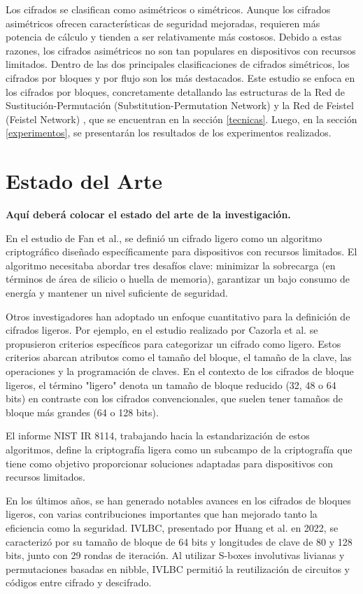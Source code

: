 \documentclass[conference]{IEEEtran}
\begin{document}
Los cifrados se clasifican como asimétricos o simétricos. Aunque los cifrados asimétricos ofrecen características de seguridad mejoradas, requieren más potencia de cálculo y tienden a ser relativamente más costosos. Debido a estas razones, los cifrados asimétricos no son tan populares en dispositivos con recursos limitados. Dentro de las dos principales clasificaciones de cifrados simétricos, los cifrados por bloques y por flujo son los más destacados. Este estudio se enfoca en los cifrados por bloques, concretamente detallando las estructuras de la Red de Sustitución-Permutación (Substitution-Permutation Network) \cite{heys1996substitution} y la Red de Feistel (Feistel Network) \cite{FEISTEL}, que se encuentran en la sección \ref{tecnicas}. Luego, en la sección \ref{experimentos}, se presentarán los resultados de los experimentos realizados.

\section{Estado del Arte}
\textbf{Aquí deberá colocar el estado del arte de la investigación.}

En el estudio de Fan et al.\cite{fan2013wg}, se definió un cifrado ligero como un algoritmo criptográfico diseñado específicamente para dispositivos con recursos limitados. El algoritmo necesitaba abordar tres desafíos clave: minimizar la sobrecarga (en términos de área de silicio o huella de memoria), garantizar un bajo consumo de energía y mantener un nivel suficiente de seguridad.

Otros investigadores han adoptado un enfoque cuantitativo para la definición de cifrados ligeros. Por ejemplo, en el estudio realizado por Cazorla et al.\cite{cazorla2013survey} se propusieron criterios específicos para categorizar un cifrado como ligero. Estos criterios abarcan atributos como el tamaño del bloque, el tamaño de la clave, las operaciones y la programación de claves. En el contexto de los cifrados de bloque ligeros, el término "ligero" denota un tamaño de bloque reducido (32, 48 o 64 bits) en contraste con los cifrados convencionales, que suelen tener tamaños de bloque más grandes (64 o 128 bits).

El informe NIST IR 8114\cite{NIST}, trabajando hacia la estandarización de estos algoritmos, define la criptografía ligera como un subcampo de la criptografía que tiene como objetivo proporcionar soluciones adaptadas para dispositivos con recursos limitados.


En los últimos años, se han generado notables avances en los cifrados de bloques ligeros, con varias contribuciones importantes que han mejorado tanto la eficiencia como la seguridad. IVLBC, presentado por Huang et al.\cite{IVLBC} en 2022, se caracterizó por su tamaño de bloque de 64 bits y longitudes de clave de 80 y 128 bits, junto con 29 rondas de iteración. Al utilizar S-boxes involutivas livianas y permutaciones basadas en nibble, IVLBC permitió la reutilización de circuitos y códigos entre cifrado y descifrado.
\end{document}
